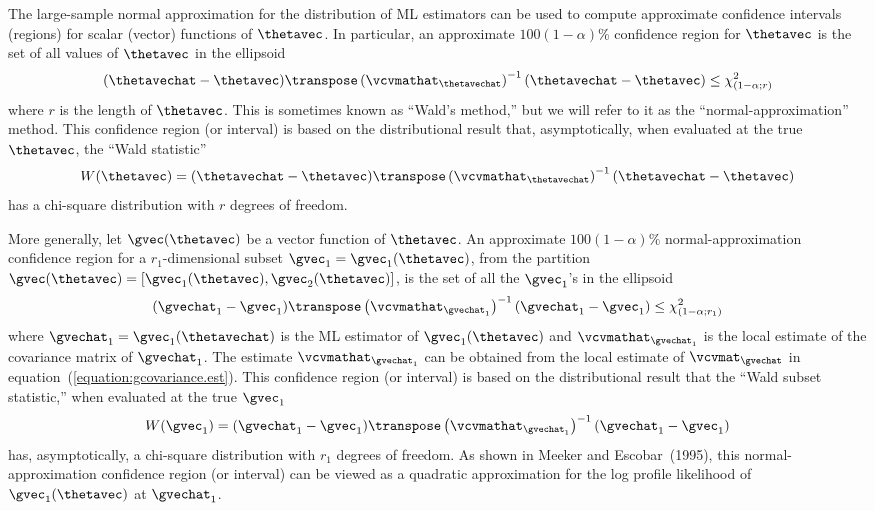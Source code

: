 The large-sample normal approximation for the distribution of ML
estimators can be used to compute approximate confidence intervals
(regions) for scalar (vector) functions of $\thetavec$.  In
particular, an approximate $100(1-\alpha)$\% confidence region for
$\thetavec$ is the set of all values of $\thetavec$ in the ellipsoid
\begin{equation}
\label{equation:wald.region}
(\thetavechat -\thetavec) \transpose
\left (\vcvmathat_{\thetavechat} \right ) ^ {-1}
(\thetavechat -\thetavec) \leq \chi^{2}_{(1-\alpha;r)}
\end{equation}
where $r$ is the length of $\thetavec$.  This is sometimes known as
``Wald's method,'' but we will refer to it as the
``normal-approximation'' method. This confidence region (or
interval) is based on the distributional result that,
asymptotically, when evaluated at the true $\thetavec$, the ``Wald
statistic''
\begin{displaymath}
W(\thetavec)=(\thetavechat -\thetavec ) \transpose
\left (\vcvmathat_{\thetavechat} \right ) ^ {-1}
(\thetavechat -\thetavec )
\end{displaymath}
has a chi-square distribution 
with $r$ degrees of freedom.


More generally, let $\gvec(\thetavec)$ be a vector function
of $\thetavec$. An approximate $100(1-\alpha)\%$
normal-approximation confidence region for a $r_{1}$-dimensional
subset $\gvec_{1}=\gvec_{1}(\thetavec)$, from the partition
$\gvec(\thetavec)= \left [\gvec_{1}(\thetavec),
\gvec_{2}(\thetavec) \right ]$, is
the set of all the $\gvec_{1}$'s in the
ellipsoid
\begin{displaymath}
(\gvechat_{1} -\gvec_{1}) \transpose
\left (\vcvmathat_{\gvechat_{1}} \right ) ^ {-1}
(\gvechat_{1} -\gvec_{1}) \leq \chi^{2}_{(1-\alpha;r_{1})}
\end{displaymath}
where $\gvechat_{1}=\gvec_{1}(\thetavechat)$ is the ML estimator of
$\gvec_{1}(\thetavec)$ and $\vcvmathat_{\gvechat_{1}}$ is the local
estimate of the covariance matrix of $\gvechat_{1}$.  The estimate
$\vcvmathat_{\gvechat_{1}}$ can be obtained from the local estimate
of $ \vcvmat_{\gvechat}$ in
equation~(\ref{equation:gcovariance.est}).  This confidence region
(or interval) is based on the distributional result that the ``Wald
subset statistic,'' when evaluated at the true $\gvec_{1}$
\begin{displaymath}
W(\gvec_{1} )=(\gvechat_{1} -\gvec_{1} ) \transpose
\left (\vcvmathat_{\gvechat_{1}} \right ) ^ {-1}
(\gvechat_{1} -\gvec_{1} ) 
\end{displaymath}
has, asymptotically, a
chi-square distribution with $r_{1}$ degrees of freedom.
As shown in Meeker and Escobar~(1995), this 
normal-approximation confidence region (or interval)
can be viewed as a quadratic approximation
for the log profile likelihood of $\gvec_{1}(\thetavec)$ at
$\gvechat_{1}$.

